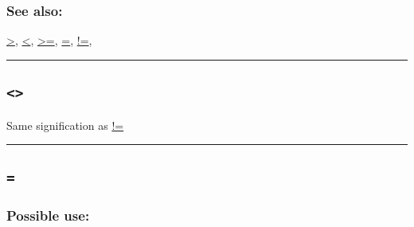 \documentclass[]{book}
\theoremstyle{definition}
\theoremstyle{definition}
\theoremstyle{definition}
\theoremstyle{remark}
\begin{document}
\subsubsection{See also:}\label{see-also-10}

\href{OperatorsAA\#\%3E}{\textgreater{}},
\href{OperatorsAA\#\%3C}{\textless{}},
\href{OperatorsAA\#\%3E=}{\textgreater{}=}, \href{OperatorsAA\#=}{=},
\href{OperatorsAA\#!=}{!=},

\begin{center}\rule{0.5\linewidth}{\linethickness}\end{center}

\subsection{\texorpdfstring{\texttt{\textless{}\textgreater{}}}{\textless{}\textgreater{}}}\label{section-15}

Same signification as \href{OperatorsAA\#!=}{!=}

\begin{center}\rule{0.5\linewidth}{\linethickness}\end{center}

\subsection{\texorpdfstring{\texttt{=}}{=}}\label{section-16}

\subsubsection{Possible use:}\label{possible-use-13}
\end{document}
